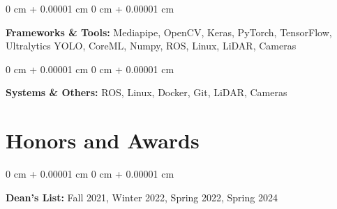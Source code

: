\documentclass[10pt, letterpaper]{article}
\newenvironment{onecolentry}{
    \begin{adjustwidth}{
        0 cm + 0.00001 cm
    }{
        0 cm + 0.00001 cm
    }
}{
    \end{adjustwidth}
} %
\begin{document}
        \vspace{0.2 cm}

        \begin{onecolentry}
            \textbf{Frameworks \& Tools:} Mediapipe, OpenCV, Keras, PyTorch, TensorFlow, Ultralytics YOLO, CoreML, Numpy, ROS, Linux, LiDAR, Cameras 
        \end{onecolentry}

        \vspace{0.2 cm}

        \begin{onecolentry}
            \textbf{Systems \& Others:} ROS, Linux, Docker, Git, LiDAR, Cameras 
        \end{onecolentry}

    \section{Honors and Awards}
        \begin{onecolentry}
            \textbf{Dean's List: } Fall 2021, Winter 2022, Spring 2022, Spring 2024
        \end{onecolentry}


    
\end{document}

